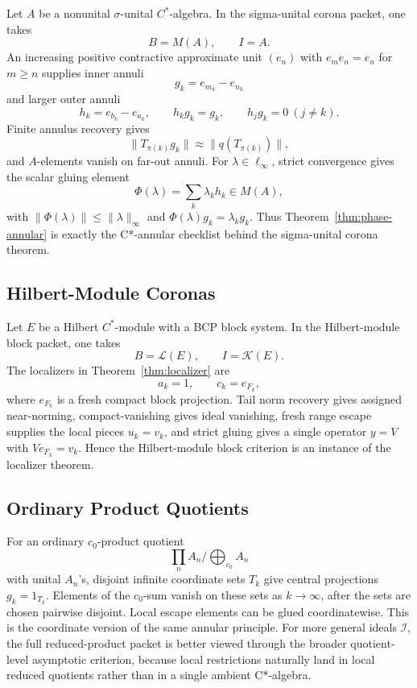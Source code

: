 \documentclass[11pt]{article}
\newcommand{\Lcal}{\mathcal L}
\newcommand{\Kcal}{\mathcal K}
\begin{document}
Let \(A\) be a nonunital \(\sigma\)-unital \(C^*\)-algebra.  In the
sigma-unital corona packet, one takes
\[
        B=M(A),\qquad I=A.
\]
An increasing positive contractive approximate unit \((e_n)\) with
\(e_me_n=e_n\) for \(m\ge n\) supplies inner annuli
\[
        g_k=e_{m_k}-e_{n_k}
\]
and larger outer annuli
\[
        h_k=e_{b_k}-e_{a_k},\qquad h_kg_k=g_k,\qquad h_jg_k=0\ (j\ne k).
\]
Finite annulus recovery gives
\[
        \|T_{\pi(k)}g_k\|\approx \|q(T_{\pi(k)})\|,
\]
and \(A\)-elements vanish on far-out annuli.  For
\(\lambda\in\ell_\infty\), strict convergence gives the scalar gluing element
\[
        \Phi(\lambda)=\sum_k\lambda_kh_k\in M(A),
\]
with \(\|\Phi(\lambda)\|\le\|\lambda\|_\infty\) and
\(\Phi(\lambda)g_k=\lambda_kg_k\).  Thus Theorem~\ref{thm:phase-annular}
is exactly the C*-annular checklist behind the sigma-unital corona theorem.

\subsection*{Hilbert-Module Coronas}

Let \(E\) be a Hilbert \(C^*\)-module with a BCP block system.  In the
Hilbert-module block packet, one takes
\[
        B=\Lcal(E),\qquad I=\Kcal(E).
\]
The localizers in Theorem~\ref{thm:localizer} are
\[
        a_k=1,\qquad c_k=e_{F_k},
\]
where \(e_{F_k}\) is a fresh compact block projection.  Tail norm recovery
gives assigned near-norming, compact-vanishing gives ideal vanishing, fresh
range escape supplies the local pieces \(u_k=v_k\), and strict gluing gives a
single operator \(y=V\) with \(Ve_{F_k}=v_k\).  Hence the Hilbert-module block
criterion is an instance of the localizer theorem.

\subsection*{Ordinary Product Quotients}

For an ordinary \(c_0\)-product quotient
\[
        \prod_n A_n\Big/\bigoplus\nolimits_{c_0}A_n
\]
with unital \(A_n\)'s, disjoint infinite coordinate sets \(T_k\) give central
projections \(g_k=1_{T_k}\).  Elements of the \(c_0\)-sum vanish on these
sets as \(k\to\infty\), after the sets are chosen pairwise disjoint.  Local
escape elements can be glued coordinatewise.  This is the coordinate version
of the same annular principle.  For more general ideals \(\mathcal I\), the
full reduced-product packet is better viewed through the broader
quotient-level asymptotic criterion, because local restrictions naturally
land in local reduced quotients rather than in a single ambient C*-algebra.
\end{document}
